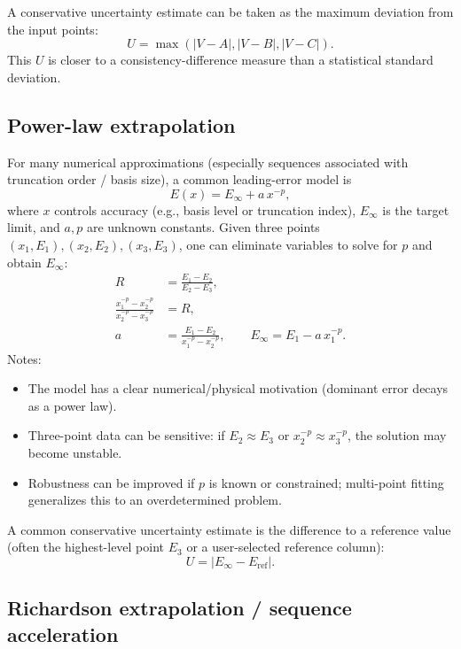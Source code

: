 \documentclass[a4paper,11pt]{article}
\begin{document}
A conservative uncertainty estimate can be taken as the maximum deviation from the input points:
\begin{equation}
U=\max\left(|V-A|,|V-B|,|V-C|\right).
\end{equation}
This $U$ is closer to a consistency-difference measure than a statistical standard deviation.

\subsection{Power-law extrapolation}

For many numerical approximations (especially sequences associated with truncation order / basis size), a common leading-error model is
\begin{equation}
E(x) = E_\infty + a\,x^{-p},
\end{equation}
where $x$ controls accuracy (e.g., basis level or truncation index), $E_\infty$ is the target limit, and $a,p$ are unknown constants. Given three points $(x_1,E_1),(x_2,E_2),(x_3,E_3)$, one can eliminate variables to solve for $p$ and obtain $E_\infty$:
\begin{align}
R &= \frac{E_1-E_2}{E_2-E_3},\\
\frac{x_1^{-p}-x_2^{-p}}{x_2^{-p}-x_3^{-p}} &= R,\\
a &= \frac{E_1-E_2}{x_1^{-p}-x_2^{-p}},\qquad
E_\infty = E_1 - a\,x_1^{-p}.
\end{align}
Notes:
\begin{itemize}
  \item The model has a clear numerical/physical motivation (dominant error decays as a power law).
  \item Three-point data can be sensitive: if $E_2\approx E_3$ or $x_2^{-p}\approx x_3^{-p}$, the solution may become unstable.
  \item Robustness can be improved if $p$ is known or constrained; multi-point fitting generalizes this to an overdetermined problem.
\end{itemize}

A common conservative uncertainty estimate is the difference to a reference value (often the highest-level point $E_3$ or a user-selected reference column):
\begin{equation}
U = |E_\infty - E_{\mathrm{ref}}|.
\end{equation}

\subsection{Richardson extrapolation / sequence acceleration}
\end{document}
